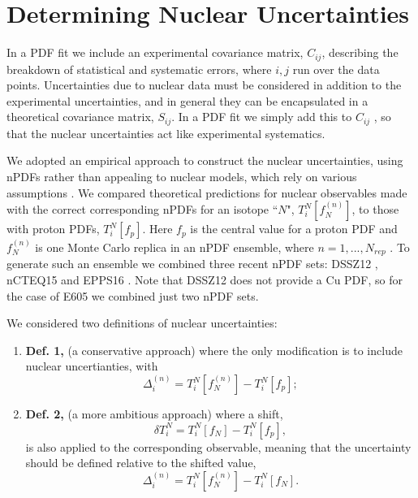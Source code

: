 \section{Determining Nuclear Uncertainties} \label{sec:nucuncs}
%
In a PDF fit we include an experimental covariance matrix, $C_{ij}$, describing the breakdown of statistical and systematic errors, where $i,j$ run over the data points. Uncertainties due to nuclear data must be considered in addition to the experimental uncertainties, and in general they can be encapsulated in a theoretical covariance matrix, $S_{ij}$. In a PDF fit we simply add this to $C_{ij}$ \cite{Ball:2018odr}, so that the nuclear uncertainties act like experimental systematics.

We adopted an empirical approach to construct the nuclear uncertainties, using nPDFs rather than appealing to nuclear models, which rely on various assumptions \cite{Arneodo:1992wf}. We compared theoretical predictions for nuclear observables made with the correct corresponding nPDFs for an isotope ``$N$", $T_i^N[f_N^{(n)}]$, to those with proton PDFs, $T_i^N[f_p]$. Here $f_p$ is the central value for a proton PDF and $f_N^{(n)}$ is one Monte Carlo replica in an nPDF ensemble, where $n = 1, ..., N_{rep}$ \cite{Butterworth:2015oua}. To generate such an ensemble we combined three recent nPDF sets: DSSZ12 \cite{deFlorian:2011fp}, nCTEQ15 \cite{Kovarik:2015cma} and EPPS16 \cite{Eskola:2016oht}. Note that DSSZ12 does not provide a Cu PDF, so for the case of E605 we combined just two nPDF sets.

We considered two definitions of nuclear uncertainties:
\begin{enumerate}
\item \textbf{Def. 1, }(a conservative approach) where the only modification is to include nuclear uncertianties, with \begin{equation}
\Delta_i^{(n)} = T_i^N[f_N^{(n)}] - T_i^N[f_p];
\end{equation}
\item \textbf{Def. 2, } (a more ambitious approach) where a shift,
\begin{equation}
\delta T_i^N = T_i^N[f_N] - T_i^N[f_p],
\end{equation} 
is also applied to the corresponding observable, meaning that the uncertainty should be defined relative to the shifted value,
\begin{equation}
\Delta_i^{(n)} = T_i^N[f_N^{(n)}] - T_i^N[f_N].
\end{equation}
\end{enumerate}

